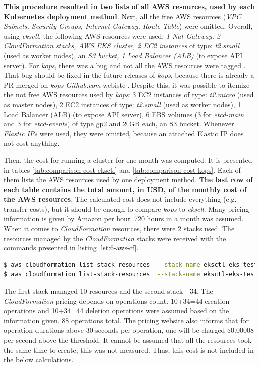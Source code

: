 \textbf{This procedure resulted in two lists of all AWS resources, used by each Kubernetes deployment method}. Next, all the free AWS resources (\textit{VPC Subnets, Security Groups, Internet Gateway, Route Table}) were omitted. Overall, using \textit{eksctl}, the following AWS resources were used: \textit{1 Nat Gateway, 2 CloudFormation stacks, AWS EKS cluster, 2 EC2 instances} of type: \textit{t2.small} (used as worker nodes), an \textit{S3 bucket, 1 Load Balancer (ALB)} (to expose API server). For \textit{kops}, there was a bug and not all the AWS resources were tagged \cite{kops-issue-tags}. That bug should be fixed in the future releases of \textit{kops}, because there is already a PR merged on \textit{kops} \textit{Github.com} webiste \cite{kops-issue-tags-pr}. Despite this, it was possible to itemize the not free AWS resources used by \textit{kops}: 3 EC2 instances of type: \textit{t2.micro} (used as master nodes), 2 EC2 instances of type: \textit{t2.small} (used as worker nodes), 1 Load Balancer (ALB) (to expose API server), 6 EBS volumes (3 for \textit{etcd-main} and 3 for \textit{etcd-events}) of type gp2 and 20GB each, an S3 bucket. Whenever \textit{Elastic IPs} were used, they were omitted, because an attached Elastic IP does not cost anything.

Then, the cost for running a cluster for one month was computed. It is presented in tables \ref{tab:comparison-cost-eksctl} and \ref{tab:comparison-cost-kops}. Each of them lists the AWS resources used by one deployment method. \textbf{The last row of each table contains the total amount, in USD, of the monthly cost of the AWS resources}. The calculated cost does not include everything (e.g. transfer costs), but it should be enough to compare \textit{kops} to \textit{eksctl}. Many pricing information is given by Amazon per hour. 720 hours in a month was assumed. When it comes to \textit{CloudFormation} resources, there were 2 stacks used. The resources managed by the \textit{CloudFormation} stacks were received with the commands presented in listing \ref{lst:6-aws-cf}.
\begin{lstlisting}[basicstyle=\scriptsize,xleftmargin=0cm, label=lst:6-aws-cf,caption={AWS CLI commands used to list CloudFormation resources used by \textit{eksctl}},captionpos=b,language=Bash]
$ aws cloudformation list-stack-resources  --stack-name eksctl-eks-testing-nodegroup-ng-1
$ aws cloudformation list-stack-resources  --stack-name eksctl-eks-testing-cluster
\end{lstlisting}
The first stack managed 10 resources and the second stack - 34. The \textit{CloudFormation} pricing \cite{amazon-cf-pricing} depends on operations count. 10+34=44 creation operations and 10+34=44 deletion operations were assumed based on the information given. 88 operations total. The pricing website also informs that for operation durations above 30 seconds per operation, one will be charged \$0.00008 per second above the threshold. It cannot be assumed that all the resources took the same time to create, this was not measured. Thus, this cost is not included in the below calculations.

